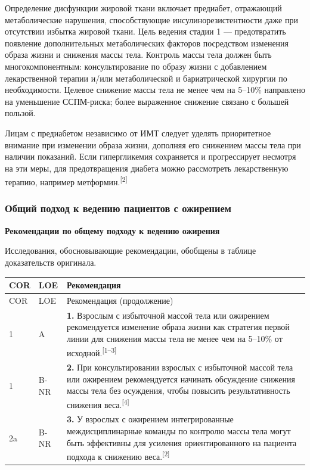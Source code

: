 \documentclass[11pt,a4paper]{article}
\newcommand{\src}[1]{\textsuperscript{[#1]}}
\newcommand{\heading}[1]{\par\medskip\textbf{#1}\par}
\begin{document}
Определение дисфункции жировой ткани включает предиабет, отражающий метаболические нарушения, способствующие инсулинорезистентности даже при отсутствии избытка жировой ткани. Цель ведения стадии 1 --- предотвратить появление дополнительных метаболических факторов посредством изменения образа жизни и снижения массы тела. Контроль массы тела должен быть многокомпонентным: консультирование по образу жизни с добавлением лекарственной терапии и/или метаболической и бариатрической хирургии по необходимости. Целевое снижение массы тела не менее чем на 5--10\% направлено на уменьшение ССПМ-риска; более выраженное снижение связано с большей пользой.

Лицам с предиабетом независимо от ИМТ следует уделять приоритетное внимание при изменении образа жизни, дополняя его снижением массы тела при наличии показаний. Если гипергликемия сохраняется и прогрессирует несмотря на эти меры, для предотвращения диабета можно рассмотреть лекарственную терапию, например метформин.\src{2}

\subsubsection{Общий подход к ведению пациентов с ожирением}
\heading{Рекомендации по общему подходу к ведению ожирения}
Исследования, обосновывающие рекомендации, обобщены в таблице доказательств оригинала.
{\small
\begin{longtable}{P{0.07\textwidth}P{0.11\textwidth}P{0.75\textwidth}}
\toprule COR & LOE & Рекомендация\\\midrule
\endfirsthead
\toprule COR & LOE & Рекомендация (продолжение)\\\midrule
{} & A & \textbf{1.} Взрослым с избыточной массой тела или ожирением рекомендуется изменение образа жизни как стратегия первой линии для снижения массы тела не менее чем на 5--10\% от исходной.\src{1--3}\\[5pt]
1 & B-NR & \textbf{2.} При консультировании взрослых с избыточной массой тела или ожирением рекомендуется начинать обсуждение снижения массы тела без осуждения, чтобы повысить результативность снижения веса.\src{4}\\[5pt]
2a & B-NR & \textbf{3.} У взрослых с ожирением интегрированные междисциплинарные команды по контролю массы тела могут быть эффективны для усиления ориентированного на пациента подхода к снижению веса.\src{2}\\
\bottomrule
\end{longtable}
}
\end{document}
